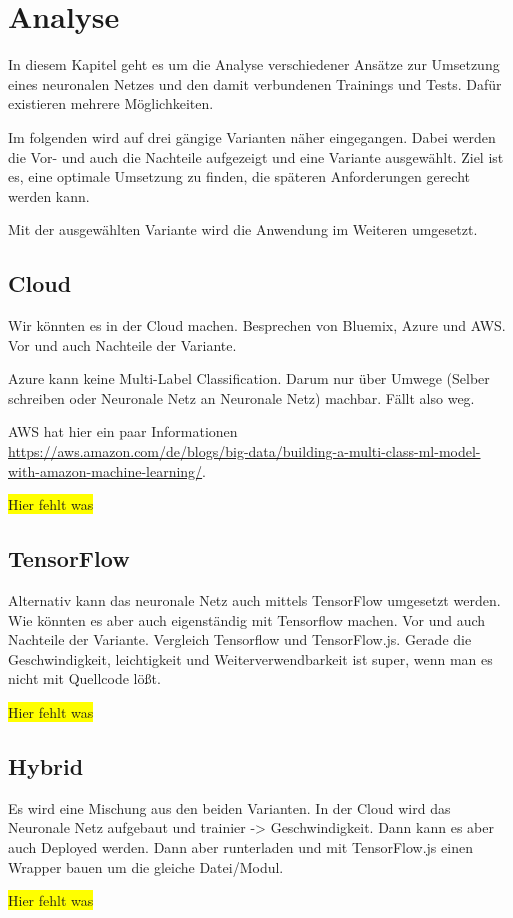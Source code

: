 \section{Analyse}
\label{sec:analyse}
In diesem Kapitel geht es um die Analyse verschiedener Ansätze zur Umsetzung eines neuronalen Netzes und den damit
verbundenen Trainings und Tests. Dafür existieren mehrere Möglichkeiten.

Im folgenden wird auf drei gängige Varianten näher eingegangen. Dabei werden die Vor- und auch die Nachteile aufgezeigt
und eine Variante ausgewählt. Ziel ist es, eine optimale Umsetzung zu finden, die späteren Anforderungen gerecht werden
kann.

Mit der ausgewählten Variante wird die Anwendung im Weiteren umgesetzt.

\subsection{Cloud}
Wir könnten es in der Cloud machen. Besprechen von Bluemix, Azure und AWS. Vor und auch Nachteile der Variante.

Azure kann keine Multi-Label Classification. Darum nur über Umwege (Selber schreiben oder Neuronale Netz an Neuronale Netz)
machbar. Fällt also weg.

AWS hat hier ein paar Informationen\\
\url{https://aws.amazon.com/de/blogs/big-data/building-a-multi-class-ml-model-with-amazon-machine-learning/}.

\colorbox{yellow}{Hier fehlt was}

\subsection{TensorFlow}
Alternativ kann das neuronale Netz auch mittels TensorFlow umgesetzt werden.
Wie könnten es aber auch eigenständig mit Tensorflow machen. Vor und auch Nachteile der Variante. Vergleich Tensorflow
und TensorFlow.js. Gerade die Geschwindigkeit, leichtigkeit und Weiterverwendbarkeit ist super, wenn man es nicht mit
Quellcode lößt.

\colorbox{yellow}{Hier fehlt was}

\subsection{Hybrid}
Es wird eine Mischung aus den beiden Varianten. In der Cloud wird das Neuronale Netz aufgebaut und trainier -> Geschwindigkeit.
Dann kann es aber auch Deployed werden. Dann aber runterladen und mit TensorFlow.js einen Wrapper bauen um die gleiche
Datei/Modul.

\colorbox{yellow}{Hier fehlt was}